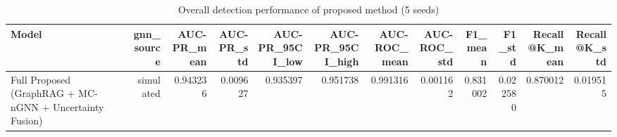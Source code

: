 \begin{table}[t]
\centering
\caption{Overall detection performance of proposed method (5 seeds)}
\label{tab:main_results}
\small
\begin{tabular}{lrrrrrrrrrrr}
\toprule
Model & gnn_source & AUC-PR_mean & AUC-PR_std & AUC-PR_95CI_low & AUC-PR_95CI_high & AUC-ROC_mean & AUC-ROC_std & F1_mean & F1_std & Recall@K_mean & Recall@K_std \\
\midrule
Full Proposed (GraphRAG + MC-nGNN + Uncertainty Fusion) & simulated & 0.943236 & 0.009627 & 0.935397 & 0.951738 & 0.991316 & 0.001162 & 0.831002 & 0.022580 & 0.870012 & 0.019515 \\
\bottomrule
\end{tabular}
\end{table}
